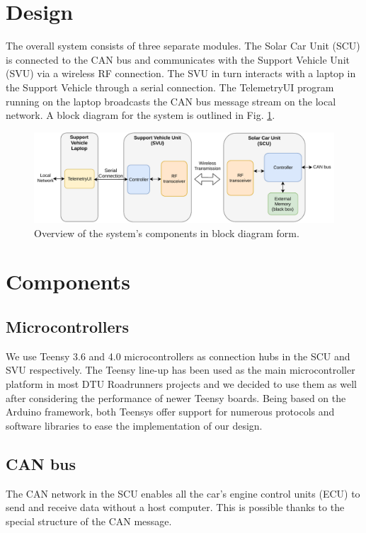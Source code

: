 \documentclass[a4paper,conference]{IEEEtran}
\begin{document}
\section{Design}
The overall system consists of three separate modules. The Solar Car Unit (SCU) is connected to the CAN bus and communicates with the Support Vehicle Unit (SVU) via a wireless RF connection. The SVU in turn interacts with a laptop in the Support Vehicle through a serial connection. The TelemetryUI program running on the laptop broadcasts the CAN bus message stream on the local network. A block diagram for the system is outlined in Fig. \ref{fig:schematic}. 
\begin{figure}[h]
    \centering
    \includegraphics[width=\linewidth]{documentation/images/SystemSchematic.pdf}
    \caption{Overview of the system's components in block diagram form.}
    \label{fig:schematic}
\end{figure}

\section{Components}

\subsection{Microcontrollers} %
We use Teensy 3.6 and 4.0 microcontrollers as connection hubs in the SCU and SVU respectively. The Teensy line-up has been used as the main microcontroller platform in most DTU Roadrunners projects and we decided to use them as well after considering the performance of newer Teensy boards. Being based on the Arduino framework, both Teensys offer support for numerous protocols and software libraries to ease the implementation of our design. 

\subsection{CAN bus}
The CAN network in the SCU enables all the car's engine control units (ECU) to send and receive data without a host computer. This is possible thanks to the special structure of the CAN message.
\end{document}
